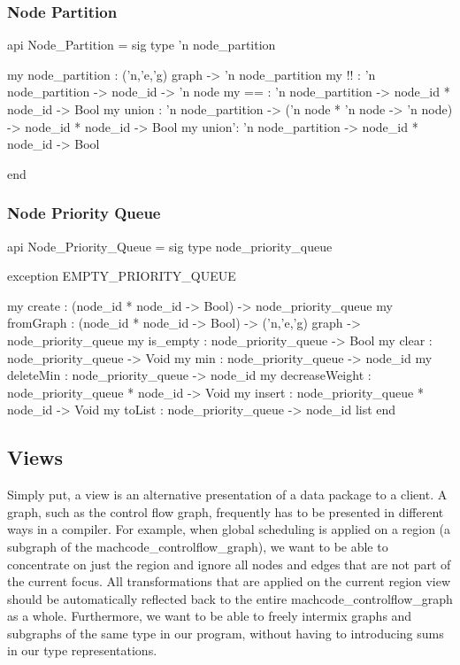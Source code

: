 \subsubsection{Node Partition}
\begin{SML}
 api Node_Partition = sig 
   type 'n node_partition

   my node_partition : ('n,'e,'g) graph -> 'n node_partition
   my !!    : 'n node_partition -> node_id -> 'n node
   my ==    : 'n node_partition -> node_id * node_id -> Bool
   my union : 'n node_partition -> ('n node * 'n node -> 'n node) ->
                                        node_id * node_id -> Bool
   my union': 'n node_partition -> node_id * node_id -> Bool

 end
\end{SML}

\subsubsection{Node Priority Queue}
\begin{SML}
 api Node_Priority_Queue = sig 
   type node_priority_queue

   exception EMPTY_PRIORITY_QUEUE

   my create         : (node_id * node_id -> Bool) -> node_priority_queue
   my fromGraph      : (node_id * node_id -> Bool) -> 
      ('n,'e,'g) graph -> node_priority_queue
   my is_empty        : node_priority_queue -> Bool
   my clear          : node_priority_queue -> Void
   my min            : node_priority_queue -> node_id
   my deleteMin      : node_priority_queue -> node_id
   my decreaseWeight : node_priority_queue * node_id -> Void
   my insert         : node_priority_queue * node_id -> Void
   my toList         : node_priority_queue -> node_id list
 end
\end{SML}

\subsection{Views}\label{sec:views}
Simply put, a view is an alternative presentation
of a data package to a client.  A graph, such as the control flow
graph, frequently has to be presented in different ways in a compiler.  
For example, when global scheduling is applied on a region 
(a subgraph of the machcode_controlflow_graph),
we want to be able to concentrate on just the region and ignore all
nodes and edges that are not part of the current focus.  
All transformations that are applied on the current region view should be
automatically reflected back to the entire machcode_controlflow_graph as a whole.
Furthermore, we want to be able to freely intermix
graphs and subgraphs of the same type in our program, without having
to introducing sums in our type representations.

